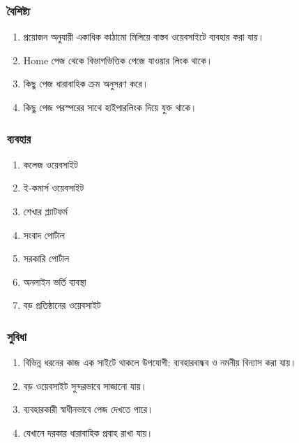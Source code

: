 \par\noindent
\begin{minipage}[t]{.48\linewidth}\vspace{0pt}
\subsubsection{বৈশিষ্ট্য}

\begin{enumerate}
\item প্রয়োজন অনুযায়ী একাধিক কাঠামো মিলিয়ে বাস্তব ওয়েবসাইটে ব্যবহার করা যায়।
\item Home পেজ থেকে বিভাগভিত্তিক পেজে যাওয়ার লিংক থাকে।
\item কিছু পেজ ধারাবাহিক ক্রম অনুসরণ করে।
\item কিছু পেজ পরস্পরের সাথে হাইপারলিংক দিয়ে যুক্ত থাকে।
\end{enumerate}
\end{minipage}\hfill
\begin{minipage}[t]{.48\linewidth}\vspace{0pt}
\subsubsection{ব্যবহার}

\begin{enumerate}
\item কলেজ ওয়েবসাইট
\item ই-কমার্স ওয়েবসাইট
\item শেখার প্ল্যাটফর্ম
\item সংবাদ পোর্টাল
\item সরকারি পোর্টাল
\item অনলাইন ভর্তি ব্যবস্থা
\item বড় প্রতিষ্ঠানের ওয়েবসাইট
\end{enumerate}
\end{minipage}\par\smallskip
\par\noindent
\begin{minipage}[t]{.48\linewidth}\vspace{0pt}
\subsubsection{সুবিধা}
\begin{enumerate}
\item বিভিন্ন ধরনের কাজ এক সাইটে থাকলে উপযোগী; ব্যবহারবান্ধব ও নমনীয় বিন্যাস করা যায়।
\item বড় ওয়েবসাইট সুন্দরভাবে সাজানো যায়।
\item ব্যবহারকারী স্বাধীনভাবে পেজ দেখতে পারে।
\item যেখানে দরকার ধারাবাহিক প্রবাহ রাখা যায়।
\end{enumerate}
\end{minipage}\hfill
